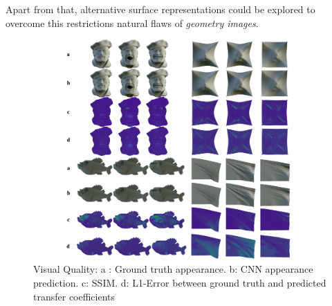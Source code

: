 Apart from that, alternative surface representations could be explored to overcome this restrictions natural flaws of \textit{geometry images}. 
\begin{figure}
  \centering
    \includegraphics[width=0.7\paperwidth]{Figures/DPRT_quality_SSIM.pdf}
     \caption{Visual Quality:
     a : Ground truth appearance. b: CNN appearance prediction. c: SSIM. d: L1-Error between ground truth and predicted transfer coefficients }
     \label{Fig: DPRT_Quality}
\end{figure}